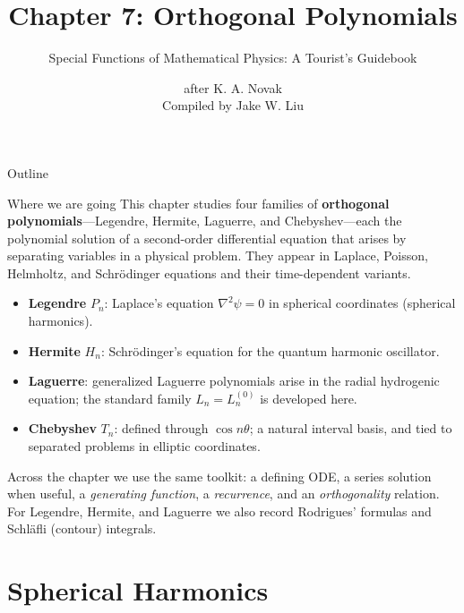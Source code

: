 \documentclass[11pt]{beamer}
\author[]{\texorpdfstring{after K. A. Novak\\Compiled by Jake W. Liu}{after K. A. Novak, Compiled by Jake W. Liu}}
\title[Orthogonal Polynomials]{Chapter 7: Orthogonal Polynomials}
\subtitle{Special Functions of Mathematical Physics: A Tourist's Guidebook}
\begin{document}
\setcounter{sfchapter}{7}
\renewcommand{\thesection}{\arabic{sfchapter}.\arabic{section}}

\begin{frame}[c]\titlepage
\end{frame}

\begin{frame}{Outline}
\tableofcontents
\end{frame}

\begin{frame}{Where we are going}
\footnotesize
This chapter studies four families of \textbf{orthogonal polynomials}---Legendre,
Hermite, Laguerre, and Chebyshev---each the polynomial solution of a second-order
differential equation that arises by separating variables in a physical problem.
They appear in Laplace, Poisson, Helmholtz, and Schr\"odinger equations and their
time-dependent variants.
\begin{itemize}
  \item \textbf{Legendre} $P_n$: Laplace's equation $\nabla^2\psi=0$ in spherical
        coordinates (spherical harmonics).
  \item \textbf{Hermite} $H_n$: Schr\"odinger's equation for the quantum harmonic
        oscillator.
  \item \textbf{Laguerre}: generalized Laguerre polynomials arise in the radial
        hydrogenic equation; the standard family $L_n=L_n^{(0)}$ is developed here.
  \item \textbf{Chebyshev} $T_n$: defined through $\cos n\theta$; a natural interval
        basis, and tied to separated problems in elliptic coordinates.
\end{itemize}
Across the chapter we use the same toolkit: a defining ODE, a series solution when useful,
a \emph{generating function}, a \emph{recurrence}, and an \emph{orthogonality} relation.
For Legendre, Hermite, and Laguerre we also record Rodrigues' formulas and
Schl\"afli (contour) integrals.
\end{frame}

\section{Spherical Harmonics}
\end{document}
